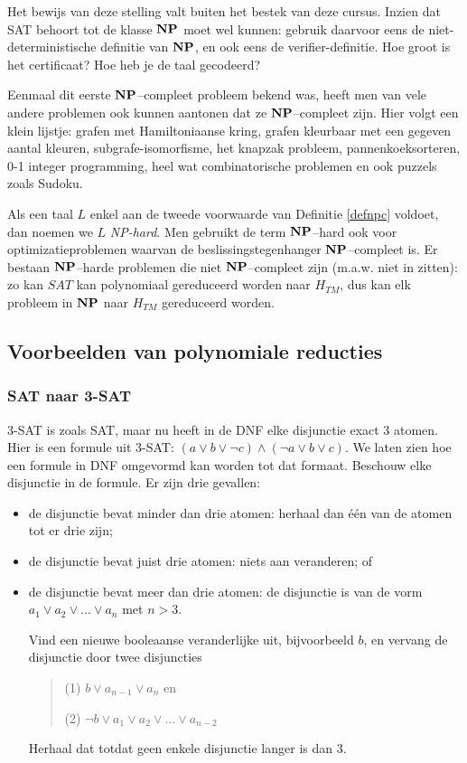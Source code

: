 Het bewijs van deze stelling valt buiten het bestek van deze
cursus. Inzien dat SAT behoort tot de klasse ${\bf NP}$ moet wel kunnen:
gebruik daarvoor eens de niet-deterministische definitie van ${\bf NP}$, en
ook eens de verifier-definitie. Hoe groot is het certificaat? Hoe heb
je de taal gecodeerd?

Eenmaal dit eerste ${\bf NP}$--compleet probleem bekend was, heeft men van
vele andere problemen ook kunnen aantonen dat ze ${\bf NP}$--compleet
zijn. Hier volgt een klein lijstje: grafen met Hamiltoniaanse kring,
grafen kleurbaar met een gegeven aantal kleuren, subgrafe-isomorfisme,
het knapzak probleem, pannenkoeksorteren, 0-1 integer programming,
heel wat combinatorische problemen en ook puzzels zoals Sudoku.

Als een taal $L$ enkel aan de tweede voorwaarde van Definitie
\ref{defnpc} voldoet, dan noemen we $L$ {\em NP-hard}. Men gebruikt de
term ${\bf NP}$--hard ook voor optimizatieproblemen waarvan de
beslissingstegenhanger ${\bf NP}$--compleet is. Er bestaan 
${\bf NP}$--harde problemen die niet ${\bf NP}$--compleet zijn (m.a.w. niet in
\NP zitten): zo kan $SAT$ kan polynomiaal gereduceerd worden naar
$H_{TM}$, dus kan elk probleem in ${\bf NP}$ naar $H_{TM}$ gereduceerd
worden.


\subsection{Voorbeelden van polynomiale reducties}

\subsubsection{SAT naar 3-SAT}

3-SAT is zoals SAT, maar nu heeft in de DNF elke disjunctie exact 3
atomen. Hier is een formule uit 3-SAT:
%
$(a \vee b \vee \neg c) \wedge (\neg a \vee b \vee c)$. We laten zien
hoe een formule in DNF omgevormd kan worden tot dat formaat. Beschouw
elke disjunctie in de formule. Er zijn drie gevallen:
\begin{itemize}
\item 
de disjunctie bevat minder dan drie atomen: herhaal dan \'{e}\'{e}n van
de atomen tot er drie zijn;
\item 
de disjunctie bevat juist drie atomen: niets aan veranderen; of
\item 
de disjunctie bevat meer dan drie atomen: de disjunctie is van de vorm 
%
$a_1 \vee a_2 \vee  ... \vee a_n$ met $n > 3$.

Vind een nieuwe booleaanse veranderlijke uit, bijvoorbeeld $b$, en vervang
de disjunctie door twee disjuncties
\begin{verse}
(1) $b \vee a_{n-1} \vee a_n$ en

(2) $\neg b \vee a_1 \vee a_2 \vee  ... \vee a_{n-2}$
\end{verse}

Herhaal dat totdat geen enkele disjunctie langer is dan 3.
\end{itemize}


